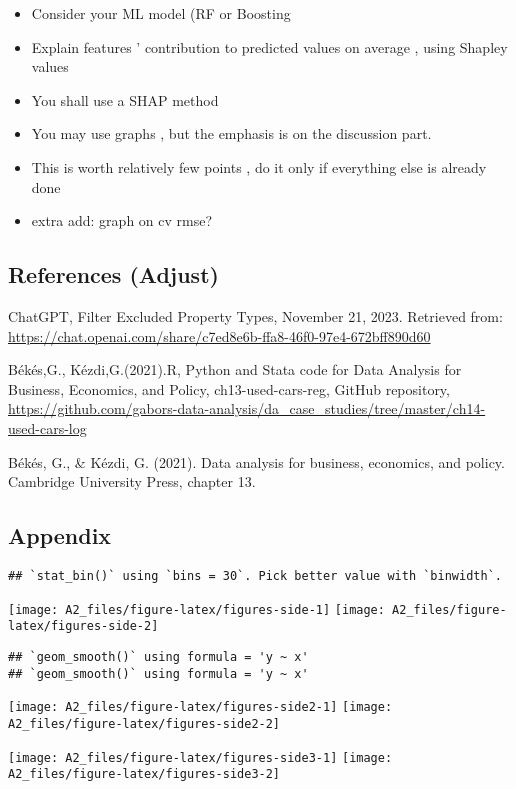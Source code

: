 \documentclass[
]{article}
\providecommand{\tightlist}{%
  \setlength{\itemsep}{0pt}\setlength{\parskip}{0pt}}
\begin{document}
\begin{itemize}
\tightlist
\item
  Consider your ML model (RF or Boosting
\item
  Explain features ' contribution to predicted values on average , using
  Shapley values
\item
  You shall use a SHAP method
\item
  You may use graphs , but the emphasis is on the discussion part.
\item
  This is worth relatively few points , do it only if everything else is
  already done
\item
  extra add: graph on cv rmse?
\end{itemize}

\hypertarget{references-adjust}{%
\subsection{References (Adjust)}\label{references-adjust}}

ChatGPT, Filter Excluded Property Types, November 21, 2023. Retrieved
from:
\url{https://chat.openai.com/share/c7ed8e6b-ffa8-46f0-97e4-672bff890d60}

Békés,G., Kézdi,G.(2021).R, Python and Stata code for Data Analysis for
Business, Economics, and Policy, ch13-used-cars-reg, GitHub repository,
\url{https://github.com/gabors-data-analysis/da_case_studies/tree/master/ch14-used-cars-log}

Békés, G., \& Kézdi, G. (2021). Data analysis for business, economics,
and policy. Cambridge University Press, chapter 13.

\hypertarget{appendix}{%
\subsection{Appendix}\label{appendix}}

\begin{verbatim}
## `stat_bin()` using `bins = 30`. Pick better value with `binwidth`.
\end{verbatim}

\texttt{[image: A2\_files/figure-latex/figures-side-1]}
\texttt{[image: A2\_files/figure-latex/figures-side-2]}

\begin{verbatim}
## `geom_smooth()` using formula = 'y ~ x'
## `geom_smooth()` using formula = 'y ~ x'
\end{verbatim}

\texttt{[image: A2\_files/figure-latex/figures-side2-1]}
\texttt{[image: A2\_files/figure-latex/figures-side2-2]}

\texttt{[image: A2\_files/figure-latex/figures-side3-1]}
\texttt{[image: A2\_files/figure-latex/figures-side3-2]}
\end{document}
